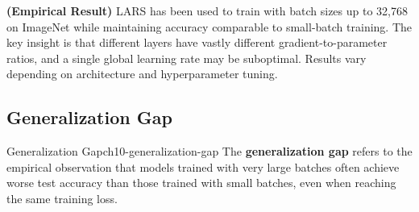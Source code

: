 \documentclass[../../main.tex]{subfiles}
\begin{document}
\begin{principle}[title=LARS Enables Extreme Batch Sizes]
\textbf{(Empirical Result)} LARS has been used to train with batch sizes up to 32,768 on ImageNet while maintaining accuracy comparable to small-batch training. The key insight is that different layers have vastly different gradient-to-parameter ratios, and a single global learning rate may be suboptimal. Results vary depending on architecture and hyperparameter tuning.
\end{principle}

\subsection{Generalization Gap}

\begin{definition}{Generalization Gap}{ch10-generalization-gap}
The \textbf{generalization gap} refers to the empirical observation that models trained with very large batches often achieve worse test accuracy than those trained with small batches, even when reaching the same training loss.
\end{definition}
\end{document}

